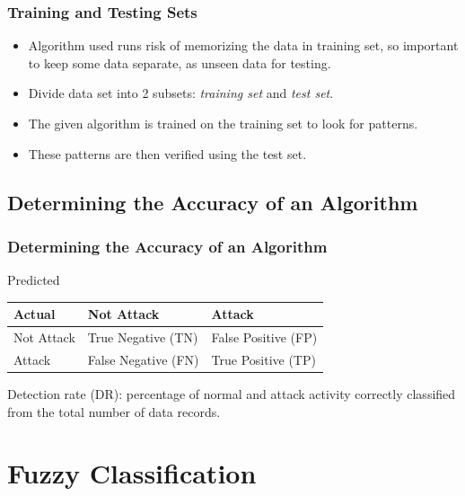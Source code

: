 \documentclass{beamer}
\newcommand{\linespace}{\vskip 0.25cm}
\begin{document}
\begin{frame}
  \frametitle{Training and Testing Sets}
	\begin{itemize}
		\item Algorithm used runs risk of memorizing the data in training set, so important to keep some data separate, as unseen data for testing.
        \linespace
        \linespace
		\item Divide data set into 2 subsets: \emph{training set} and \emph{test set}.
        \item The given algorithm is trained on the training set to look for patterns.
        \item These patterns are then verified using the test set.
	\end{itemize}
\end{frame}



\subsection{Determining the Accuracy of an Algorithm}
\begin{frame}
  \frametitle{Determining the Accuracy of an Algorithm}
\begin{table}
Predicted
\begin{tabular}{l|ll}
Actual   & Not Attack & Attack \\ \hline
Not Attack & True Negative (TN) & False Positive (FP) \\
Attack & False Negative (FN) & True Positive (TP)  \\
\end{tabular}
\end{table}
\linespace
\linespace
\begin{center}
Detection rate (DR): percentage of normal and attack activity correctly classified from the total number of data records.
\end{center}
\end{frame}
\section[Fuzzy Classification]{Fuzzy Classification}
\end{document}
